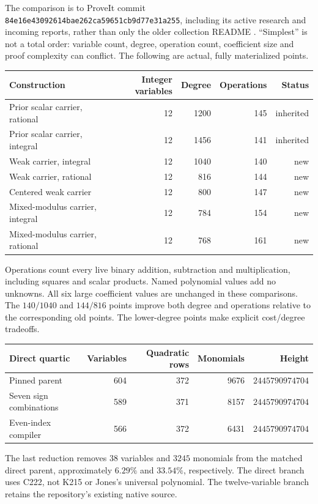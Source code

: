 \documentclass[11pt]{article}
\newcommand{\file}[1]{\nolinkurl{#1}}
\theoremstyle{definition}\newtheorem{definition}[theorem]{Definition}
\theoremstyle{remark}\newtheorem{remark}[theorem]{Remark}
\begin{document}
The comparison is to ProveIt commit
\file{84e16e43092614bae262ca59651cb9d77e31a255}, including its active research
and incoming reports, rather than only the older collection README
\cite{repo,latest}. ``Simplest'' is not a total order: variable count,
degree, operation count, coefficient size and proof complexity can conflict.
The following are actual, fully materialized points.

\begin{center}
\begin{tabular}{lrrrr}
\toprule
Construction & Integer variables & Degree & Operations & Status\\
\midrule
Prior scalar carrier, rational &12&1200&145& inherited\\
Prior scalar carrier, integral &12&1456&141& inherited\\
Weak carrier, integral &12&1040&140& new\\
Weak carrier, rational &12&816&144& new\\
Centered weak carrier &12&800&147& new\\
Mixed-modulus carrier, integral &12&784&154& new\\
Mixed-modulus carrier, rational &12&768&161& new\\
\bottomrule
\end{tabular}
\end{center}
Operations count every live binary addition, subtraction and multiplication,
including squares and scalar products. Named polynomial values add no
unknowns. All six large coefficient values are unchanged in these comparisons.
The $140/1040$ and $144/816$ points improve both degree and operations
relative to the corresponding old points. The lower-degree points make
explicit cost/degree tradeoffs.

\begin{center}
\begin{tabular}{lrrrr}
\toprule
Direct quartic & Variables & Quadratic rows & Monomials & Height\\
\midrule
Pinned parent &604&372&9676&$2445790974704$\\
Seven sign combinations &589&371&8157&$2445790974704$\\
Even-index compiler &566&372&6431&$2445790974704$\\
\bottomrule
\end{tabular}
\end{center}
The last reduction removes $38$ variables and $3245$ monomials from the
matched direct parent, approximately $6.29\%$ and $33.54\%$, respectively.
The direct branch uses C222, not K215 or Jones's universal polynomial.
The twelve-variable branch retains the repository's existing native source.
\end{document}
